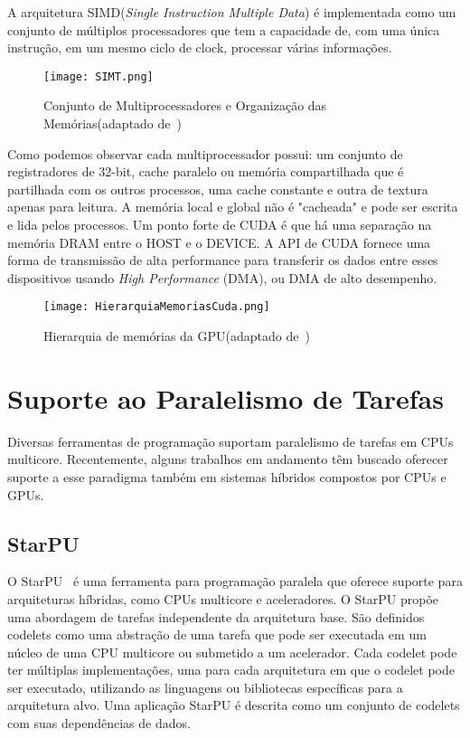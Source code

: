 A arquitetura SIMD(\textit{Single Instruction Multiple Data}) é implementada como um conjunto de múltiplos processadores que tem a capacidade de, com uma única instrução, em um mesmo ciclo de clock, processar várias informações.

\begin{figure}[!htb]
	\begin{center}
	\centering
			\texttt{[image: SIMT.png]}
	\label{fig: SIMT}
	\caption{Conjunto de Multiprocessadores e Organização das Memórias(adaptado de~\citep{cuda})}
	\end{center}
\end{figure}

Como podemos observar cada multiprocessador possui: um conjunto de registradores de 32-bit, cache paralelo ou memória compartilhada que é partilhada com os outros processos, uma cache constante e outra de textura apenas para leitura. A memória local e global não é "cacheada" e pode ser escrita e lida pelos processos.
Um ponto forte de CUDA é que há uma separação na memória DRAM entre o HOST e o DEVICE. A API de CUDA fornece uma forma de transmissão de alta performance para transferir os dados entre esses dispositivos usando \textit{High Performance} (DMA), ou DMA de alto desempenho.

\begin{figure}[!htb]
	\begin{center}
	\centering
			\texttt{[image: HierarquiaMemoriasCuda.png]}
	\label{fig: HierarquiaMemoriasCuda}
	\caption{Hierarquia de memórias da GPU(adaptado de~\citep{cuda})}
	\end{center}
\end{figure}


\section{Suporte ao Paralelismo de Tarefas}
Diversas ferramentas de programação suportam paralelismo de tarefas em CPUs multicore. Recentemente, alguns trabalhos em andamento têm buscado oferecer suporte a esse paradigma também em sistemas híbridos compostos por CPUs e GPUs.




\subsection{StarPU}
 
O StarPU~\citep{starpu} é uma ferramenta para programação paralela que oferece suporte para arquiteturas híbridas, como CPUs multicore e aceleradores. O StarPU propõe uma abordagem de tarefas independente da arquitetura base. São definidos codelets como uma abstração de uma tarefa que pode ser executada em um núcleo de uma CPU multicore ou submetido a um acelerador. Cada codelet pode ter múltiplas implementações, uma para cada arquitetura em que o codelet pode ser executado, utilizando as linguagens ou bibliotecas específicas para a arquitetura alvo. Uma aplicação StarPU é descrita como um conjunto de codelets com suas dependências de dados.

